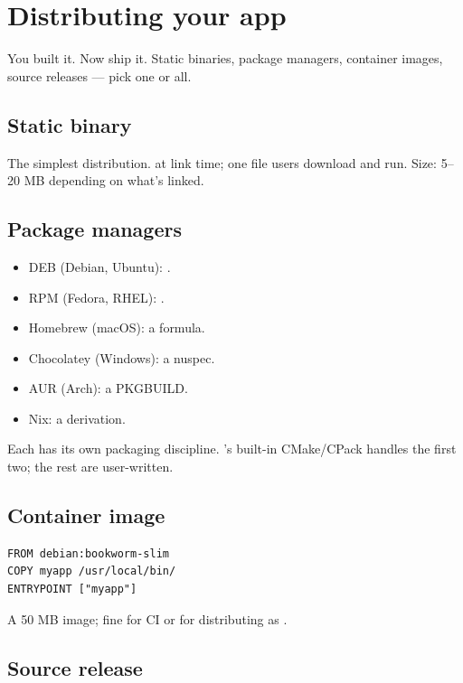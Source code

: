 \chapter{Distributing your app}
\label{ch:distrib}

\begin{aside}
You built it. Now ship it. Static binaries, package
managers, container images, source releases --- pick one or
all.
\end{aside}

\section{Static binary}

The simplest distribution.  at link time;
one file users download and run. Size: 5--20 MB depending
on what's linked.

\section{Package managers}

\begin{itemize}[leftmargin=*]
  \item DEB (Debian, Ubuntu): .
  \item RPM (Fedora, RHEL): .
  \item Homebrew (macOS): a formula.
  \item Chocolatey (Windows): a nuspec.
  \item AUR (Arch): a PKGBUILD.
  \item Nix: a derivation.
\end{itemize}

Each has its own packaging discipline. \maya{}'s built-in
CMake/CPack handles the first two; the rest are
user-written.

\section{Container image}

\begin{lstlisting}
FROM debian:bookworm-slim
COPY myapp /usr/local/bin/
ENTRYPOINT ["myapp"]
\end{lstlisting}

A 50 MB image; fine for CI or for distributing as
.

\section{Source release}

